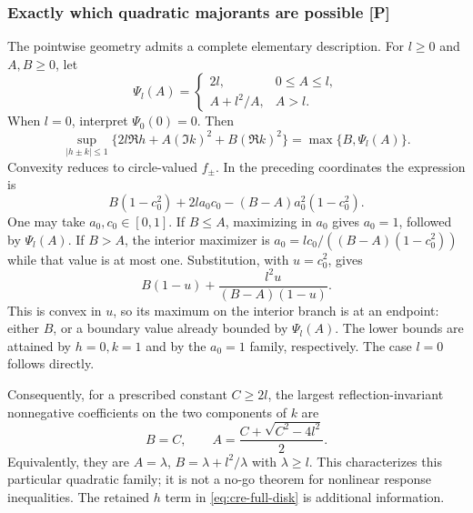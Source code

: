 \subsubsection{Exactly which quadratic majorants are possible [P]}
The pointwise geometry admits a complete elementary description.
For $l\ge0$ and $A,B\ge0$, let
\[
 \Psi_l(A)=
 \begin{cases}2l,&0\le A\le l,\\ A+l^2/A,&A>l.\end{cases}
\]
When $l=0$, interpret $\Psi_0(0)=0$. Then
\begin{equation}\label{eq:cre-exact-envelope}
 \sup_{|h\pm k|\le1}
 \{2l\Re h+A(\Im k)^2+B(\Re k)^2\}
       =\max\{B,\Psi_l(A)\}.
\end{equation}
Convexity reduces to circle-valued $f_\pm$. In the preceding coordinates
the expression is
\[
 B(1-c_0^2)+2l a_0c_0-(B-A)a_0^2(1-c_0^2).
\]
One may take $a_0,c_0\in[0,1]$. If $B\le A$, maximizing in $a_0$
gives $a_0=1$, followed by $\Psi_l(A)$. If $B>A$, the interior
maximizer is $a_0=lc_0/((B-A)(1-c_0^2))$ while that value is at most
one. Substitution, with $u=c_0^2$, gives
\[
 B(1-u)+\frac{l^2u}{(B-A)(1-u)}.
\]
This is convex in $u$, so its maximum on the interior branch is at an
endpoint: either $B$, or a boundary value already bounded by
$\Psi_l(A)$. The lower bounds are attained by $h=0,k=1$ and by the
$a_0=1$ family, respectively. The case $l=0$ follows directly.

Consequently, for a prescribed constant $C\ge2l$, the largest
reflection-invariant nonnegative coefficients on the two components of
$k$ are
\[
 B=C,\qquad A=\frac{C+\sqrt{C^2-4l^2}}2.
\]
Equivalently, they are $A=\lambda$, $B=\lambda+l^2/\lambda$ with
$\lambda\ge l$. This characterizes this particular quadratic family;
it is not a no-go theorem for nonlinear response inequalities. The
retained $h$ term in \eqref{eq:cre-full-disk} is additional information.

